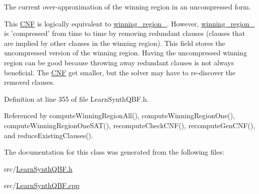 The current over-\/approximation of the winning region in an uncompressed form. 

This \hyperlink{classCNF}{C\-N\-F} is logically equivalent to \hyperlink{classLearnSynthQBF_a9c6b41f7df5f4ed4bfc5930136fc1152}{winning\-\_\-region\-\_\-}. However, \hyperlink{classLearnSynthQBF_a9c6b41f7df5f4ed4bfc5930136fc1152}{winning\-\_\-region\-\_\-} is 'compressed' from time to time by removing redundant clauses (clauses that are implied by other clauses in the winning region). This field stores the uncompressed version of the winning region. Having the uncompressed winning region can be good because throwing away redundant clauses is not always beneficial. The \hyperlink{classCNF}{C\-N\-F} get smaller, but the solver may have to re-\/discover the removed clauses. 

Definition at line 355 of file Learn\-Synth\-Q\-B\-F.\-h.



Referenced by compute\-Winning\-Region\-All(), compute\-Winning\-Region\-One(), compute\-Winning\-Region\-One\-S\-A\-T(), recompute\-Check\-C\-N\-F(), recompute\-Gen\-C\-N\-F(), and reduce\-Existing\-Clauses().



The documentation for this class was generated from the following files\-:\begin{DoxyCompactItemize}
\item 
src/\hyperlink{LearnSynthQBF_8h}{Learn\-Synth\-Q\-B\-F.\-h}\item 
src/\hyperlink{LearnSynthQBF_8cpp}{Learn\-Synth\-Q\-B\-F.\-cpp}\end{DoxyCompactItemize}
